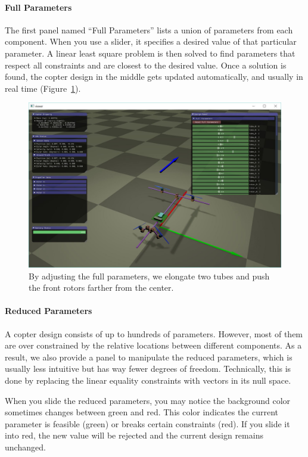 \paragraph{Full Parameters} The first panel named ``Full Parameters'' lists a union of parameters from each component. When you use a slider, it specifies a desired value of that particular parameter. A linear least square problem is then solved to find parameters that respect all constraints and are closest to the desired value. Once a solution is found, the copter design in the middle gets updated automatically, and usually in real time (Figure~\ref{fig:vtail_change_full_param}).
\begin{figure}[!htb]
  \centering
  \includegraphics[width=0.9\linewidth]{vtail_change_full_param}
  \caption{By adjusting the full parameters, we elongate two tubes and push the front rotors farther from the center.}
  \label{fig:vtail_change_full_param}
\end{figure}

\paragraph{Reduced Parameters} A copter design consists of up to hundreds of parameters. However, most of them are over constrained by the relative locations between different components. As a result, we also provide a panel to manipulate the reduced parameters, which is usually less intuitive but has way fewer degrees of freedom. Technically, this is done by replacing the linear equality constraints with vectors in its null space.

When you slide the reduced parameters, you may notice the background color sometimes changes between green and red. This color indicates the current parameter is feasible (green) or breaks certain constraints (red). If you slide it into red, the new value will be rejected and the current design remains unchanged.

